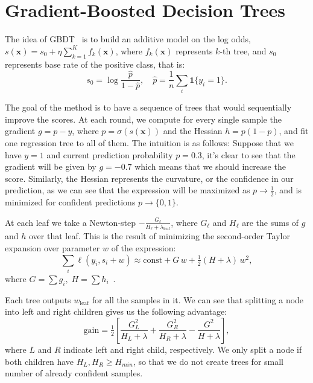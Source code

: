 \documentclass[10pt,conference,compsocconf]{IEEEtran}
\begin{document}
\section{Gradient-Boosted Decision Trees}
\label{sec:gbdt}

The idea of GBDT~\cite{friedman01gbm} is to build an additive model on the log odds, $s(\mathbf{x}) = s_0 + \eta\sum_{k=1}^K{f_k(\mathbf{x})}$,
where $f_k(\mathbf{x})$ represents $k$-th tree, and $s_0$ represents base rate of the positive class, that is:
\begin{equation*}
  s_0 = \log{\frac{\hat{p}}{1-\hat{p}}}, \quad \hat{p} = \frac{1}{n}\sum_{i}{\mathbf{1}\{y_i = 1\}}.
\end{equation*}

The goal of the method is to have a sequence of trees that would sequentially improve the scores. At each round, we compute for every single sample the gradient $g = p - y$, where $p = \sigma(s(\mathbf{x}))$ and the Hessian $h = p(1 - p)$, and fit one regression tree to all of them. The intuition is as follows: Suppose that we have $y = 1$ and current prediction probability $p = 0.3$, it's clear to see that the gradient will be given by $g = -0.7$ which means that we should increase the score. Similarly, the Hessian represents the curvature, or the confidence in our prediction, as we can see that the expression will be maximized as $p \rightarrow \frac{1}{2}$, and is minimized for confident predictions $p \rightarrow \{0,1\}$. 

At each leaf we take a Newton-step $-\frac{G_\ell}{H_\ell + \lambda_{\text{leaf}}}$, where $G_\ell$ and $H_\ell$ are the sums of $g$ and $h$ over that leaf. This is the result of minimizing the second-order Taylor expansion over parameter $w$ of the expression:
\begin{equation*}
  \sum_i \ell(y_i, s_i + w) \approx \text{const} + G\,w + \tfrac12 (H + \lambda)\, w^2,
\end{equation*}
where $G = \sum g_i,\; H = \sum h_i$~\cite{chen16xgboost}.

Each tree outputs $w_\text{leaf}$ for all the samples in it. We can see that splitting a node into left and right children gives us the following advantage:
\begin{equation*}
  \text{gain} = \tfrac12\left[\frac{G_L^2}{H_L+\lambda} + \frac{G_R^2}{H_R+\lambda} - \frac{G^2}{H+\lambda}\right],
\end{equation*}
where $L$ and $R$ indicate left and right child, respectively. We only split a node if both children have $H_L, H_R \geq H_{min}$, so that we do not create trees for small number of already confident samples.
\end{document}
